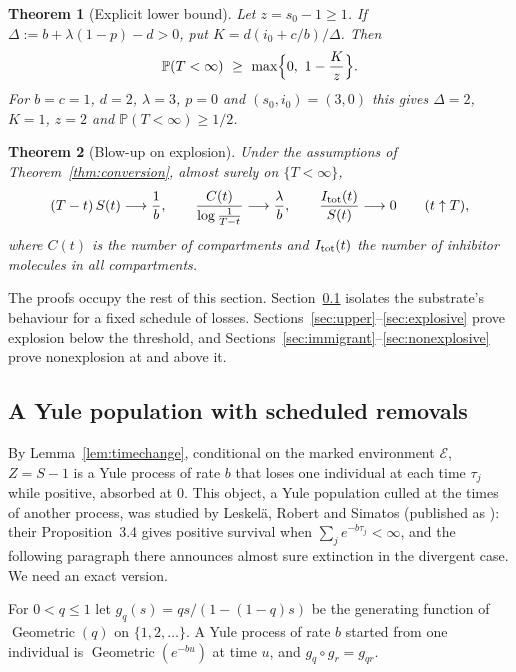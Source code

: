 \documentclass[11pt,a4paper]{article}
\numberwithin{equation}{section}
\newtheorem{theorem}{Theorem}[section]
\theoremstyle{definition}\newtheorem{definition}[theorem]{Definition}
\theoremstyle{remark}\newtheorem{remark}[theorem]{Remark}\newtheorem{example}[theorem]{Example}
\renewcommand{\P}{\mathbb P}
\newcommand{\Geo}{\operatorname{Geometric}}
\begin{document}
\begin{theorem}[Explicit lower bound]\label{thm:bound}
Let $z=s_0-1\ge1$. If $\Delta:=b+\lambda(1-p)-d>0$, put $K=d(i_0+c/b)/\Delta$. Then
\[
\P(T<\infty)\ \ge\ \max\Bigl\{0,\ 1-\frac Kz\Bigr\}.
\]
For $b=c=1$, $d=2$, $\lambda=3$, $p=0$ and $(s_0,i_0)=(3,0)$ this gives $\Delta=2$, $K=1$, $z=2$ and $\P(T<\infty)\ge1/2$.
\end{theorem}

\begin{theorem}[Blow-up on explosion]\label{thm:asymp-conv}
Under the assumptions of Theorem~\ref{thm:conversion}, almost surely on $\{T<\infty\}$,
\[
(T-t)\,S(t)\longrightarrow\frac1b,\qquad \frac{C(t)}{\log\frac1{T-t}}\longrightarrow\frac\lambda b,\qquad \frac{I_{\rm tot}(t)}{S(t)}\longrightarrow0\qquad(t\uparrow T),
\]
where $C(t)$ is the number of compartments and $I_{\rm tot}(t)$ the number of inhibitor molecules in all compartments.
\end{theorem}

The proofs occupy the rest of this section. Section~\ref{sec:sched} isolates the substrate's behaviour for a fixed schedule of losses. Sections~\ref{sec:upper}--\ref{sec:explosive} prove explosion below the threshold, and Sections~\ref{sec:immigrant}--\ref{sec:nonexplosive} prove nonexplosion at and above it.

\subsection{A Yule population with scheduled removals}\label{sec:sched}
By Lemma~\ref{lem:timechange}, conditional on the marked environment $\mathcal E$, $Z=S-1$ is a Yule process of rate $b$ that loses one individual at each time $\tau_j$ while positive, absorbed at $0$. This object, a Yule population culled at the times of another process, was studied by Leskel\"a, Robert and Simatos \cite[Section~3]{LeskelaRobertSimatos2009} (published as \cite{LeskelaRobertSimatos2010}): their Proposition~3.4 gives positive survival when $\sum_je^{-b\tau_j}<\infty$, and the following paragraph there announces almost sure extinction in the divergent case. We need an exact version.

For $0<q\le1$ let $g_q(s)=qs/(1-(1-q)s)$ be the generating function of $\Geo(q)$ on $\{1,2,\dots\}$. A Yule process of rate $b$ started from one individual is $\Geo(e^{-bu})$ at time $u$, and $g_q\circ g_r=g_{qr}$.
\end{document}
